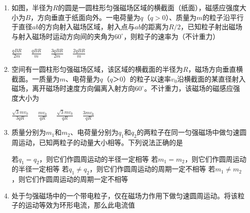 
\begin{enumerate}[leftmargin=0em]
\renewcommand{\labelenumi}{\arabic{enumi}.}
\item
{}
如图，半径为$ R $的圆是一圆柱形匀强磁场区域的横截面（纸面），磁感应强度大小为$ B $，方向垂直于纸面向外。一电荷量为$ q $（$ q>0 $）、质量为$ m $的粒子沿平行于直径$ ab $的方向射入磁场区域，射入点与$ ab $的距离为$ R/2 $，已知粒子射出磁场与射入磁场时运动方向间的夹角为$ 60 ^{ \circ } $，则粒子的速率为（不计重力）  

\begin{figure}[h!]
\centering

\end{figure}


\fourchoices
{$\frac { q B R } { 2 m } \quad$}
{$\frac { q B R } { m } \quad$}
{$\frac { 3 q B R } { 2 m } \quad$}
{$\frac { 2 q B R } { m }$}




\item
{}
空间有一圆柱形匀强磁场区域，该区域的横截面的半径为$ R $，磁场方向垂直横截面。一质量为$ m $、电荷量为$ q $（$ q $＞$ 0 $）的粒子以速率$ v_{0} $沿横截面的某直径射入磁场，离开磁场时速度方向偏离入射方向$ 60 ^{ \circ } $。不计重力，该磁场的磁感应强度大小为  

\fourchoices
{$\frac { \sqrt { 3 } m v _ { 0 } } { 3 q R } \quad$}
{$\frac { m v _ { 0 } } { q R } \quad$}
{$\frac { \sqrt { 3 } m v _ { 0 } } { q R } \quad$}
{$\frac { 3 m v _ { 0 } } { q R }$}




\item
{}
质量分别为$ m_{1} $和$ m_{2} $、电荷量分别为$ q_{1} $和$ q_{2} $的两粒子在同一匀强磁场中做匀速圆周运动，已知两粒子的动量大小相等。下列说法正确的是  


\fourchoices
{若$ q_{1} = q_{2} $，则它们作圆周运动的半径一定相等}
{若$ m_{1}= m_{2} $，则它们作圆周运动的半径一定相等}
{若$ q_{1} \neq q_{2} $，则它们作圆周运动的周期一定不相等}
{若$ m_{1} \neq m_{2} $，则它们作圆周运动的周期一定不相等}




\item
{}
处于匀强磁场中的一个带电粒子，仅在磁场力作用下做匀速圆周运动。将该粒子的运动等效为环形电流，那么此电流值  



\end{enumerate}

